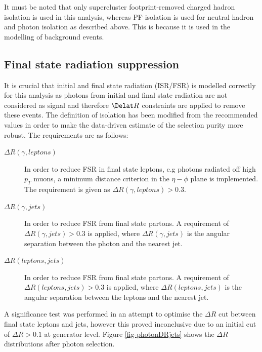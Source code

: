 It must be noted that only supercluster footprint-removed charged hadron isolation is used in this analysis, whereas PF isolation is used for neutral hadron and photon isolation as described above. This is because it is used in the modelling of background events.

\subsection{Final state radiation suppression}

It is crucial that initial and final state radiation (ISR/FSR) is modelled correctly for this analysis as photons from initial and final state radiation are not considered as signal and therefore  $\Delat R$  constraints are applied to remove these events. The definition of isolation has been modified from the recommended values in order to make the data-driven estimate of the selection purity more robust. The requirements are as follows:

\begin{description}
\item[$\Delta R(\gamma, leptons)$] In order to reduce FSR in final state leptons, e.g photons radiated off high $p_T$ muons, a minimum distance criterion in the $\eta - \phi$ plane is implemented. The requirement is given as $\Delta R(\gamma, leptons) > 0.3$.

\item[$\Delta R(\gamma, jets)$] In order to reduce FSR from final state partons. A requirement of $\Delta R(\gamma, jets) > 0.3$ is applied, where $\Delta R(\gamma, jets)$ is the angular separation between the photon and the nearest jet.

\item[$\Delta R(leptons, jets)$] In order to reduce FSR from final state partons. A requirement of $\Delta R(leptons, jets) > 0.3$ is applied, where $\Delta R(leptons, jets)$ is the angular separation between the leptons and the nearest jet.
\end{description}

A significance test was performed in an attempt to optimise the $\Delta R$ cut between final state leptons and jets, however this proved inconclusive due to an initial cut of $\Delta R > 0.1$ at generator level. Figure \ref{fig-photonDRjets} shows the $\Delta R$ distributions after photon selection.

